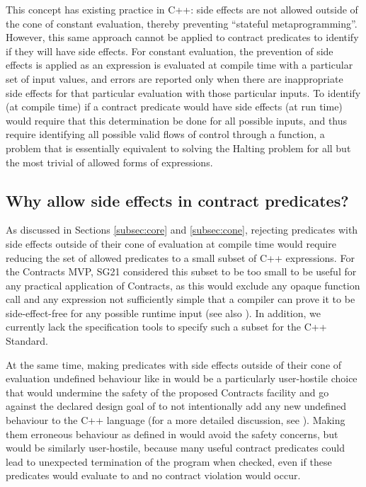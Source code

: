 This concept has existing practice in C++: side effects are not allowed outside of the cone of constant evaluation, thereby preventing ``stateful metaprogramming''. However,
this same approach cannot be applied to contract predicates to identify if they will have side effects.   For constant evaluation, the prevention of side effects is applied as an expression is evaluated at compile time with a particular set of input values, and errors are  reported only when there are inappropriate side effects for that particular evaluation with those particular inputs. To identify (at compile time) if a contract predicate would have side effects (at run time) would require that this determination be done for all possible inputs, and thus require identifying all possible valid flows of control through a function, a problem that is essentially equivalent to solving the Halting problem for all but the most trivial of allowed forms of expressions.

\subsection{Why allow side effects in contract predicates?}

As discussed in Sections \ref{subsec:core} and \ref{subsec:cone}, rejecting predicates with side effects outside of their cone of evaluation at compile time would require reducing the set of allowed predicates to a small subset of C++ expressions. For the Contracts MVP, SG21 considered this subset to be too small to be useful for any practical application of Contracts, as this would exclude any opaque function call and any expression not sufficiently simple that a compiler can prove it to be side-effect-free for any possible runtime input (see also \cite{P2700R1}). In addition, we currently lack the specification tools to specify such a subset for the C++ Standard.

At the same time, making predicates with side effects outside of their cone of evaluation undefined behaviour like in \cite{P0542R5} would be a particularly user-hostile choice that would undermine the safety of the proposed Contracts facility and go against the declared design goal of \cite{P2900R6} to not intentionally add any new undefined behaviour to the C++ language (for a more detailed discussion, see \cite{P1670R0}). Making them erroneous behaviour as defined in \cite{P2795R5} would avoid the safety concerns, but would be similarly user-hostile, because many useful contract predicates could lead to unexpected termination of the program when checked, even if these predicates would evaluate to  and no contract violation would occur.

